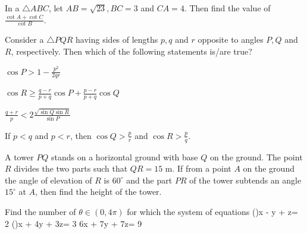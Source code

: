   \stopitemize
\item In a $\triangle ABC$, let $AB = \sqrt{23}, BC = 3$ and $CA = 4$. Then find the value of $\frac{\cot A
  + \cot C}{\cot B}$.
\item Consider a $\triangle PQR$ having sides of lengths $p, q$ and $r$ opposite to angles $P, Q$ and $R$,
  respectively. Then which of the following statements is/are true?
  \startitemize[a, 1*broad]
  \item $\cos P > 1 - \frac{p^2}{2qr}$
  \item $\cos R\ge \frac{q - r}{p + q}\cos P + \frac{p - r}{p + q}\cos Q$
  \item $\frac{q + r}{p} < 2\frac{\sqrt{\sin Q\sin R}}{\sin P}$
  \item If $p < q$ and $p < r$, then $\cos Q > \frac{p}{r}$ and $\cos R > \frac{p}{q}$.
  \stopitemize
\item A tower $PQ$ stands on a horizontal ground with base $Q$ on the ground. The point $R$ divides the two
  parts such that $QR = 15$ m. If from a point $A$ on the ground the angle of elevation of $R$ is $60^\circ$
  and the part $PR$ of the tower subtends an angle $15^\circ$ at $A$, then find the height of the tower.
\item Find the number of $\theta\in(0, 4\pi)$ for which the system of equations
  \startformula\startalign
    (\theta)x - y + z\NC = 2\NR
    (\theta)x + 4y + 3z\NC = 3\NR
    \NC 6x + 7y + 7z\NC = 9\NR
  \stopalign\stopformula

